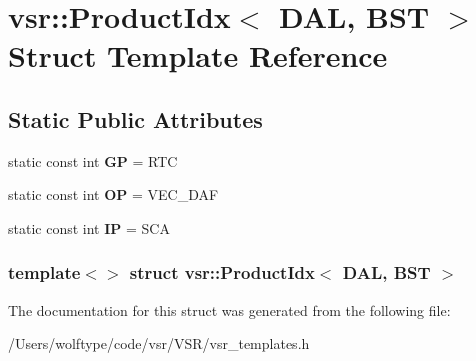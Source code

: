 \hypertarget{structvsr_1_1_product_idx_3_01_d_a_l_00_01_b_s_t_01_4}{\section{vsr\-:\-:Product\-Idx$<$ D\-A\-L, B\-S\-T $>$ Struct Template Reference}
\label{structvsr_1_1_product_idx_3_01_d_a_l_00_01_b_s_t_01_4}
}
\subsection*{Static Public Attributes}
\begin{DoxyCompactItemize}
\item 
\hypertarget{structvsr_1_1_product_idx_3_01_d_a_l_00_01_b_s_t_01_4_a9e4df020094f9a5225d08617be3fa6d0}{static const int {\bfseries G\-P} = R\-T\-C}\label{structvsr_1_1_product_idx_3_01_d_a_l_00_01_b_s_t_01_4_a9e4df020094f9a5225d08617be3fa6d0}

\item 
\hypertarget{structvsr_1_1_product_idx_3_01_d_a_l_00_01_b_s_t_01_4_ae75965ece5d0cff782911f3cc848d55d}{static const int {\bfseries O\-P} = V\-E\-C\-\_\-\-D\-A\-F}\label{structvsr_1_1_product_idx_3_01_d_a_l_00_01_b_s_t_01_4_ae75965ece5d0cff782911f3cc848d55d}

\item 
\hypertarget{structvsr_1_1_product_idx_3_01_d_a_l_00_01_b_s_t_01_4_afd6b006ce465a2999b9ee745ed220093}{static const int {\bfseries I\-P} = S\-C\-A}\label{structvsr_1_1_product_idx_3_01_d_a_l_00_01_b_s_t_01_4_afd6b006ce465a2999b9ee745ed220093}

\end{DoxyCompactItemize}
\subsubsection*{template$<$$>$ struct vsr\-::\-Product\-Idx$<$ D\-A\-L, B\-S\-T $>$}



The documentation for this struct was generated from the following file\-:\begin{DoxyCompactItemize}
\item 
/\-Users/wolftype/code/vsr/\-V\-S\-R/vsr\-\_\-templates.\-h\end{DoxyCompactItemize}
